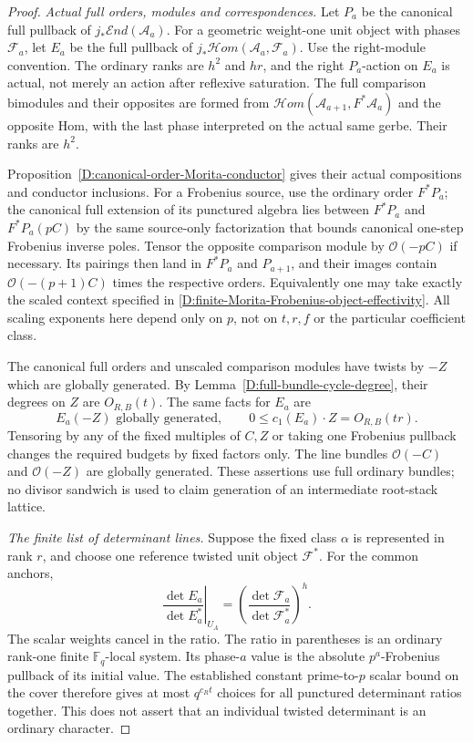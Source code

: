 \begin{proof}
\emph{Actual full orders, modules and correspondences.}
Let $P_a$ be the canonical full pullback of
$j_*\mathcal End(\mathcal A_a)$.
For a geometric weight-one unit object with phases
$\mathcal F_a$, let $E_a$ be the full pullback of
$j_*\mathcal Hom(\mathcal A_a,\mathcal F_a)$.
Use the right-module convention. The ordinary ranks are
$h^2$ and $hr$, and the right $P_a$-action on $E_a$ is
actual, not merely an action after reflexive saturation.
The full comparison bimodules and their opposites are
formed from
$\mathcal Hom(\mathcal A_{a+1},F^*\mathcal A_a)$ and
the opposite Hom, with the last phase interpreted on the
actual same gerbe. Their ranks are $h^2$.

Proposition~\ref{D:canonical-order-Morita-conductor} gives
their actual compositions and conductor inclusions.
For a Frobenius source, use the ordinary order $F^*P_a$;
the canonical full extension of its punctured algebra
lies between $F^*P_a$ and $F^*P_a(pC)$ by the same
source-only factorization that bounds canonical one-step
Frobenius inverse poles. Tensor the opposite comparison
module by $\mathcal O(-pC)$ if necessary. Its pairings
then land in $F^*P_a$ and $P_{a+1}$, and their images
contain $\mathcal O(-(p+1)C)$ times the respective orders.
Equivalently one may take exactly the scaled context
specified in
\ref{D:finite-Morita-Frobenius-object-effectivity}.
All scaling exponents here depend only on $p$, not on
$t,r,f$ or the particular coefficient class.

The canonical full orders and unscaled comparison modules
have twists by $-Z$ which are globally generated. By
Lemma~\ref{D:full-bundle-cycle-degree}, their degrees on
$Z$ are $O_{R,B}(t)$. The same facts for $E_a$ are
\[
 E_a(-Z)\text{ globally generated},\qquad
 0\le c_1(E_a)\cdot Z=O_{R,B}(tr).
                                                        \tag{D.BH.4}
\]
Tensoring by any of the fixed multiples of $C,Z$ or
taking one Frobenius pullback changes the required
budgets by fixed factors only. The line bundles
$\mathcal O(-C)$ and $\mathcal O(-Z)$ are globally
generated. These assertions use full ordinary bundles;
no divisor sandwich is used to claim generation of an
intermediate root-stack lattice.

\emph{The finite list of determinant lines.}
Suppose the fixed class $\alpha$ is represented in rank
$r$, and choose one reference twisted unit object
$\mathcal F^*$. For the common anchors,
\[
 \left.\frac{\det E_a}{\det E_a^*}\right|_{U_A}
       =\left(\frac{\det\mathcal F_a}
                        {\det\mathcal F_a^*}\right)^h.
                                                        \tag{D.BH.5}
\]
The scalar weights cancel in the ratio. The ratio in
parentheses is an ordinary rank-one finite
$\mathbb F_q$-local system. Its phase-$a$ value is the
absolute $p^a$-Frobenius pullback of its initial value.
The established constant prime-to-$p$ scalar bound on
the cover therefore gives at most $q^{c_Rt}$ choices
for all punctured determinant ratios together.
This does not assert that an individual twisted
determinant is an ordinary character.


\end{proof}
